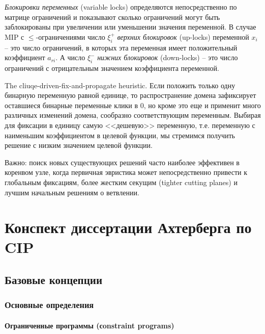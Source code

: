 \documentclass[%
	11pt,
	a4paper,
	utf8,
		]{article}
\begin{document}
\emph{Блокировки переменных} (variable locks) определяются непосредственно по матрице ограничений и показывают сколько ограничений могут быть заблокированы при увеличении или уменьшении значения переменной. В случае MIP с $ \leqslant $-ограничениями число $ \xi_i^{+} $ \emph{верхних блокировок} (up-locks) переменной $ x_i $ -- это число ограничений, в которых эта переменная имеет положительный коэффициент $ a_{ri} $. А число $ \xi_i^{-} $ \emph{нижних блокировок} (down-locks) -- это число ограничений с отрицательным значением коэффициента переменной.

The cliuqe-driven-fix-and-propagate heuristic. Если положить только одну бинарную переменную равной единице, то распространение домена зафиксирует оставшиеся бинарные переменные клики в 0, но кроме это еще и применит много различных изменений домена, сообразно соответствующим переменным. Выбирая для фиксации в единицу самую <<дешевую>> переменную, т.е. переменную с наименьшим коэффициентом в целевой функции, мы стремимся получить решение с низким значением целевой функции.

Важно: поиск новых существующих решений часто наиболее эффективен в коренвом узле, когда первичная эвристика может непосредственно привести к глобальным фиксациям, более жестким секущим (tighter cutting planes) и лучшим начальным решениям о ветвлении.


\section{Конспект диссертации Ахтерберга по CIP}

\subsection{Базовые концепции}

\subsubsection{Основные определения}

\paragraph{Ограниченные программы (сonstraint programs)}
\end{document}
